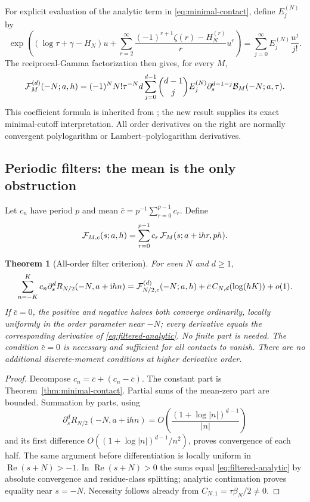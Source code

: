 \documentclass[11pt,letterpaper]{article}
\numberwithin{equation}{section}
\newtheorem{theorem}{Theorem}[section]
\theoremstyle{definition}
\theoremstyle{remark}
\DeclareMathOperator{\Ree}{Re}
\newcommand{\ii}{\mathrm i}
\begin{document}
For explicit evaluation of the analytic term in
\eqref{eq:minimal-contact}, define \(E_j^{(N)}\) by
\begin{equation}\label{eq:root-E}
 \exp\left((\log\tau+\gamma-H_N)u+
   \sum_{r=2}^{\infty}
       \frac{(-1)^{r+1}\zeta(r)-H_N^{(r)}}r u^r\right)
   =\sum_{j=0}^{\infty}E_j^{(N)}\frac{u^j}{j!}.
\end{equation}
The reciprocal-Gamma factorization then gives, for every \(M\),
\begin{equation}\label{eq:root-analytic-jets}
 {\cal F}_M^{(d)}(-N;a,h)
 =(-1)^NN!\tau^{-N}d
   \sum_{j=0}^{d-1}\binom{d-1}{j}E_j^{(N)}
       \partial_s^{d-1-j}{\cal B}_M(-N;a,\tau).
\end{equation}
This coefficient formula is inherited from \cite{RepoVertical};
the new result supplies its exact minimal-cutoff interpretation.
All order derivatives on the right are normally convergent
polylogarithm or Lambert--polylogarithm derivatives.

\subsection{Periodic filters: the mean is the only obstruction}

Let \(c_n\) have period \(p\) and mean
\(\bar c=p^{-1}\sum_{r=0}^{p-1}c_r\). Define
\begin{equation}\label{eq:filtered-analytic}
 {\cal F}_{M,c}(s;a,h)=
    \sum_{r=0}^{p-1}c_r\,
       {\cal F}_M(s;a+\ii hr,ph).
\end{equation}

\begin{theorem}[All-order filter criterion]\label{thm:filter-all}
For even \(N\) and \(d\geq1\),
\begin{equation}\label{eq:weighted-contact}
 \sum_{n=-K}^{K}c_n\partial_s^dR_{N/2}(-N,a+\ii hn)
 =
 {\cal F}_{N/2,c}^{(d)}(-N;a,h)
 +\bar c\,C_{N,d}(\log(hK))+o(1).
\end{equation}
If \(\bar c=0\), the positive and negative halves both converge
ordinarily, locally uniformly in the order parameter near \(-N\);
every derivative equals the corresponding derivative of
\eqref{eq:filtered-analytic}. No finite part is needed.
The condition \(\bar c=0\) is necessary and sufficient for all
contacts to vanish. There are no additional discrete-moment
conditions at higher derivative order.
\end{theorem}

\begin{proof}
Decompose \(c_n=\bar c+(c_n-\bar c)\). The constant part is
Theorem~\ref{thm:minimal-contact}. Partial sums of the mean-zero
part are bounded. Summation by parts, using
\[
 \partial_s^dR_{N/2}(-N,a+\ii hn)
     =O\!\left(\frac{(1+\log|n|)^{d-1}}{|n|}\right)
\]
and its first difference
\(O((1+\log|n|)^{d-1}/n^2)\), proves convergence of each half.
The same argument before differentiation is locally uniform in
\(\Ree(s+N)>-1\). In \(\Ree(s+N)>0\) the sums equal
\eqref{eq:filtered-analytic} by absolute convergence and residue-class
splitting; analytic continuation proves equality near \(s=-N\).
Necessity follows already from
\(C_{N,1}=\tau\beta_N/2\neq0\).
\end{proof}
\end{document}
